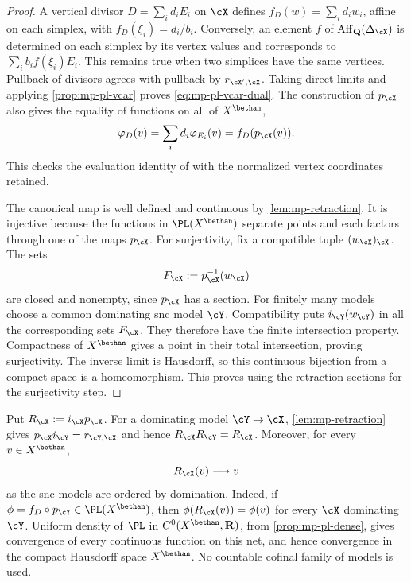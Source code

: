 \begin{proof}
A vertical divisor $D=\sum_i d_iE_i$ on $\cX$ defines
$f_D(w)=\sum_i d_iw_i$, affine on each simplex, with
$f_D(\xi_i)=d_i/b_i$. Conversely, an element $f$ of
$\operatorname{Aff}_{\mathbf Q}(\Delta_{\cX})$ is determined
on each simplex by its vertex values and corresponds to
$\sum_i b_if(\xi_i)E_i$. This remains true when two
simplices have the same vertices. Pullback of divisors
agrees with pullback by $r_{\cX',\cX}$. Taking direct limits
and applying \cref{prop:mp-pl-vcar} proves
\eqref{eq:mp-pl-vcar-dual}. The construction of $p_{\cX}$
also gives the equality of functions on all of $X^{\bethan}$,
\[
 \varphi_D(v)=\sum_i d_i\varphi_{E_i}(v)
             =f_D(p_{\cX}(v)).
\]
This checks the evaluation identity of
\cite[Lemma~3.1.2, equations~(3.1.2)--(3.1.4)]{MPTropicalV2}
with the normalized vertex coordinates retained.

The canonical map is well defined and continuous by
\cref{lem:mp-retraction}. It is injective because the
functions in $\PL(X^{\bethan})$ separate points and each
factors through one of the maps $p_{\cX}$.
For surjectivity, fix a compatible tuple
$(w_{\cX})_{\cX}$. The sets
\[
                  F_{\cX}:=p_{\cX}^{-1}(w_{\cX})
\]
are closed and nonempty, since $p_{\cX}$ has a section.
For finitely many models choose a common dominating snc
model $\cY$. Compatibility puts $i_{\cY}(w_{\cY})$ in
all the corresponding sets $F_{\cX}$. They therefore have
the finite intersection property. Compactness of $X^{\bethan}$
gives a point in their total intersection, proving surjectivity.
The inverse limit is Hausdorff, so this continuous bijection
from a compact space is a homeomorphism. This proves
\cite[Theorem~3.1.1, pp.~29--31]{MPTropicalV2} using the
retraction sections for the surjectivity step.
\end{proof}

Put $R_{\cX}:=i_{\cX}p_{\cX}$. For a dominating model
$\cY\to\cX$, \cref{lem:mp-retraction} gives
$p_{\cX}i_{\cY}=r_{\cY,\cX}$ and hence
$R_{\cX}R_{\cY}=R_{\cX}$. Moreover, for every
$v\in X^{\bethan}$,
\[
                            R_{\cX}(v)\longrightarrow v
\]
as the snc models are ordered by domination. Indeed, if
$\phi=f_D\circ p_{\cY}\in\PL(X^{\bethan})$, then
$\phi(R_{\cX}(v))=\phi(v)$ for every $\cX$ dominating
$\cY$. Uniform density of $\PL$ in
$C^0(X^{\bethan},\mathbf R)$, from \cref{prop:mp-pl-dense},
gives convergence of every continuous function on this net,
and hence convergence in the compact Hausdorff space
$X^{\bethan}$. No countable cofinal family of models is used.

